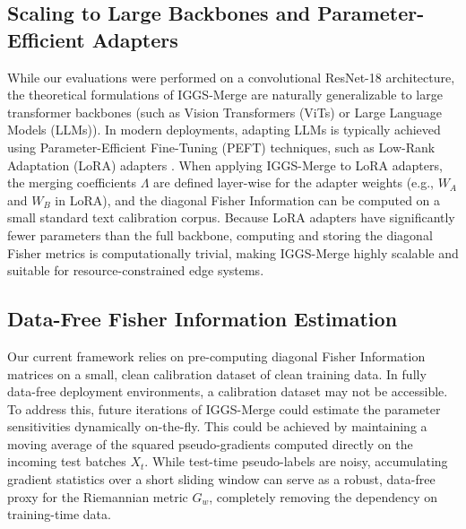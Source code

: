 \documentclass{article}
\theoremstyle{plain}
\theoremstyle{definition}
\theoremstyle{remark}
\begin{document}
\subsection{Scaling to Large Backbones and Parameter-Efficient Adapters}
While our evaluations were performed on a convolutional ResNet-18 architecture, the theoretical formulations of IGGS-Merge are naturally generalizable to large transformer backbones (such as Vision Transformers (ViTs) or Large Language Models (LLMs)). In modern deployments, adapting LLMs is typically achieved using Parameter-Efficient Fine-Tuning (PEFT) techniques, such as Low-Rank Adaptation (LoRA) adapters \cite{hu2021loralowrank}.
When applying IGGS-Merge to LoRA adapters, the merging coefficients $\Lambda$ are defined layer-wise for the adapter weights (e.g., $W_A$ and $W_B$ in LoRA), and the diagonal Fisher Information can be computed on a small standard text calibration corpus. Because LoRA adapters have significantly fewer parameters than the full backbone, computing and storing the diagonal Fisher metrics is computationally trivial, making IGGS-Merge highly scalable and suitable for resource-constrained edge systems.

\subsection{Data-Free Fisher Information Estimation}
Our current framework relies on pre-computing diagonal Fisher Information matrices on a small, clean calibration dataset of clean training data. In fully data-free deployment environments, a calibration dataset may not be accessible.
To address this, future iterations of IGGS-Merge could estimate the parameter sensitivities dynamically on-the-fly. This could be achieved by maintaining a moving average of the squared pseudo-gradients computed directly on the incoming test batches $X_t$. While test-time pseudo-labels are noisy, accumulating gradient statistics over a short sliding window can serve as a robust, data-free proxy for the Riemannian metric $G_w$, completely removing the dependency on training-time data.
\end{document}

